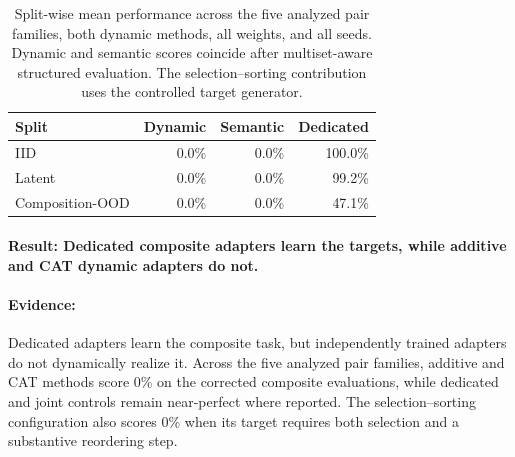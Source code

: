 \documentclass[10pt,twocolumn]{article}
\begin{document}
\begin{table}[t]
\centering
\vspace{3pt}
\small
\caption{Split-wise mean performance across the five analyzed pair families, both dynamic methods, all weights, and all seeds. Dynamic and semantic scores coincide after multiset-aware structured evaluation. The selection--sorting contribution uses the controlled target generator.}
\label{tab:split-results}
\begin{tabular}{lrrr}
\toprule
Split & Dynamic & Semantic & Dedicated \\
\midrule
IID & 0.0\% & 0.0\% & 100.0\% \\
Latent & 0.0\% & 0.0\% & 99.2\% \\
Composition-OOD & 0.0\% & 0.0\% & 47.1\% \\
\bottomrule
\end{tabular}
\end{table}

\begin{table}[t]
\centering
\vspace{3pt}
\small
\caption{Mean atomic retention and interference on the IID split. Retention is composed accuracy divided by standalone accuracy. Interference is standalone accuracy minus composed accuracy. Values average both dynamic methods, all weights, and all seeds.}
\label{tab:retention}
\end{table}

\paragraph{Result: Dedicated composite adapters learn the targets, while additive and CAT dynamic adapters do not.}

\paragraph{Evidence:} Dedicated adapters learn the composite task, but independently trained adapters do not dynamically realize it. Across the five analyzed pair families, additive and CAT methods score 0\% on the corrected composite evaluations, while dedicated and joint controls remain near-perfect where reported. The selection--sorting configuration also scores 0\% when its target requires both selection and a substantive reordering step.
\end{document}
